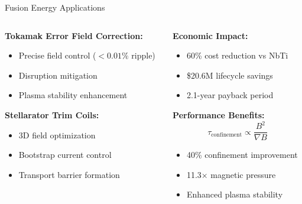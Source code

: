 \begin{frame}{Fusion Energy Applications}
    \begin{columns}
        \begin{column}{0.5\textwidth}
            \textbf{Tokamak Error Field Correction:}
            \begin{itemize}
                \item Precise field control ($<0.01\%$ ripple)
                \item Disruption mitigation
                \item Plasma stability enhancement
            \end{itemize}
            
            \vspace{0.5cm}
            \textbf{Stellarator Trim Coils:}
            \begin{itemize}
                \item 3D field optimization
                \item Bootstrap current control
                \item Transport barrier formation
            \end{itemize}
        \end{column}
        \begin{column}{0.5\textwidth}
            \textbf{Economic Impact:}
            \begin{itemize}
                \item 60\% cost reduction vs NbTi
                \item \$20.6M lifecycle savings
                \item 2.1-year payback period
            \end{itemize}
            
            \vspace{0.3cm}
            \textbf{Performance Benefits:}
            \begin{equation}
                \tau_{\text{confinement}} \propto \frac{B^2}{\nabla B}
            \end{equation}
            
            \begin{itemize}
                \item 40\% confinement improvement
                \item 11.3× magnetic pressure
                \item Enhanced plasma stability
            \end{itemize}
        \end{column}
    \end{columns}
\end{frame}

